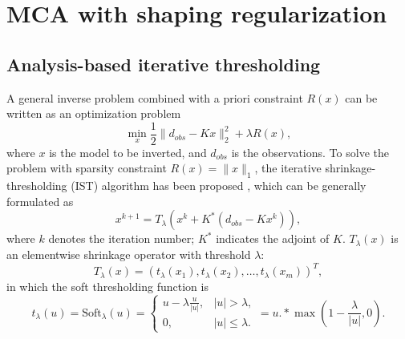 \section{MCA with shaping regularization}

\subsection{Analysis-based iterative thresholding}

A general inverse problem combined with a priori constraint $R(x)$ can be written as an optimization problem
\begin{equation}\label{eq:sparsity3}
  \min_x \frac{1}{2}\|d_{obs}-K x\|_2^2+\lambda R(x),
\end{equation}
where $x$ is the model to be inverted, and $d_{obs}$ is the observations. To solve the problem with sparsity constraint $R(x)=\|x\|_1$, the iterative shrinkage-thresholding (IST) algorithm has been proposed  \citep{daubechies2004iterative}, which can be generally formulated as
\begin{equation}\label{eq:IST}
   x^{k+1}=T_{\lambda}(x^{k}+K^*(d_{obs}-Kx^{k})),
 \end{equation}
 where $k$ denotes the iteration number; $K^*$ indicates the adjoint of $K$. $T_{\lambda}(x)$ is an elementwise shrinkage operator with threshold $\lambda$:
 \begin{equation}
    T_{\lambda}(x)=(t_{\lambda}(x_1),t_{\lambda}(x_2),\ldots,t_{\lambda}(x_m))^T,
 \end{equation}
in which  the soft thresholding function \citep{donoho1995noising} is
 \begin{equation}
  t_{\lambda}(u)=\mathrm{Soft}_{\lambda}(u)=\left\{\begin{array}{ll}
                           u-\lambda\frac{u}{|u|}, & |u|> \lambda,\\
                           0, & |u|\leq \lambda.
                         \end{array}  \right.
	=u.*\max(1-\frac{\lambda}{|u|},0).
 \end{equation}

